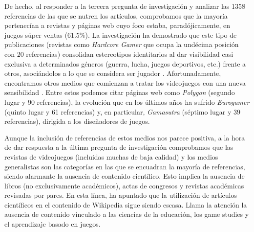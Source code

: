 \documentclass[spanish]{textolivre}
\begin{document}
De hecho, al responder a la tercera pregunta de investigación y analizar las 1358 referencias de las que se nutren los artículos, comprobamos que la mayoría pertenecían a revistas y páginas web cuyo foco estaba, paradójicamente, en juegos súper ventas (61.5\%). La investigación ha demostrado que este tipo de publicaciones (revistas como \emph{Hardcore Gamer} que ocupa la undécima posición con 20 referencias) consolidan estereotipos identitarios al dar visibilidad casi exclusiva a determinados géneros (guerra, lucha, juegos deportivos, etc.) frente a otros, asociándolos a lo que se considera ser jugador \cite{shaw_you_2012, vilasis-pamos_how_2021}. Afortunadamente, encontramos otros medios que comienzan a tratar los videojuegos con una nueva sensibilidad \cite{suter_narrative_nodate}. Entre estos podemos citar páginas web como \emph{Polygon} (segundo lugar y 90 referencias), la evolución que en los últimos años ha sufrido \emph{Eurogamer} (quinto lugar y 61 referencias) y, en particular, \emph{Gamasutra} (séptimo lugar y 39 referencias), dirigida a los diseñadores de juegos.

Aunque la inclusión de referencias de estos medios nos parece positiva, a la hora de dar respuesta a la última pregunta de investigación comprobamos que las revistas de videojuegos (incluidas muchas de baja calidad) y los medios generalistas son las categorías en las que se encuadran la mayoría de referencias, siendo alarmante la ausencia de contenido científico. Esto implica la ausencia de libros (no exclusivamente académicos), actas de congresos y revistas académicas revisadas por pares. En esta línea, \textcite{kousha_are_2017} ha apuntado que la utilización de artículos científicos en el contenido de Wikipedia sigue siendo escasa. Llama la atención la ausencia de contenido vinculado a las ciencias de la educación, los game studies y el aprendizaje basado en juegos.
\end{document}
